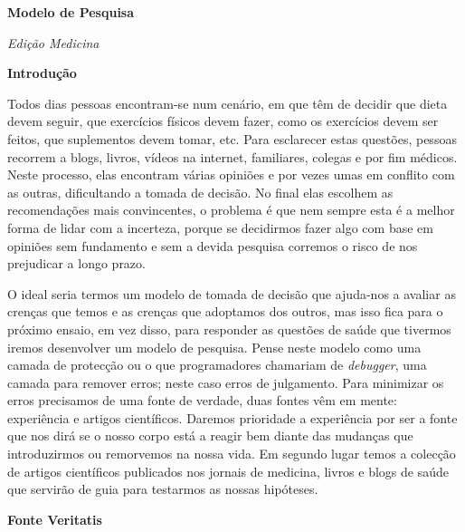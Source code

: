 \documentclass[12pt]{article}
\begin{document}
 

\begin{titlepage}
    \begin{center}
        \Huge\textbf{Modelo de Pesquisa}
         
        \Large\textit{Edi\c c\~ao Medicina}
         
        \vspace{10cm}
    \end{center}
\end{titlepage}

\begin{center}
    \Huge\textbf{Introdu\c c\~ao}
\end{center}

\justifying
Todos dias pessoas encontram-se num cen\'ario, em que t\^em de decidir que
dieta devem seguir, que exerc\'icios f\'isicos devem fazer, como os
exerc\'icios devem ser
feitos,  que suplementos
devem tomar, etc. Para esclarecer estas quest\~oes, pessoas recorrem a blogs,
livros, v\'ideos na internet, familiares, colegas e por fim  m\'edicos. Neste
processo, elas encontram v\'arias
opini\~oes e por vezes umas em conflito com as outras, dificultando a tomada
de decis\~ao. 
No final elas escolhem as recomenda\c c\~oes mais
convincentes, o problema \'e que nem sempre esta \'e a melhor forma de lidar
com a incerteza, porque se decidirmos fazer algo com base em opini\~oes
sem fundamento e sem a devida pesquisa corremos o risco de nos prejudicar a longo prazo. 

O ideal seria termos um modelo de tomada de decis\~ao que ajuda-nos a avaliar as
cren\c cas que temos e as cren\c cas que adoptamos dos outros, mas isso fica
para o pr\'oximo ensaio, em vez disso, para responder as quest\~oes de sa\'ude que
tivermos iremos desenvolver um modelo de pesquisa.  
Pense neste modelo como  uma camada de protec\c c\~ao ou o que programadores chamariam de \textit{debugger}, uma camada para remover erros; neste caso erros de julgamento.  
Para minimizar os erros precisamos de uma fonte de verdade, duas fontes v\^em
em mente: experi\^encia e artigos cient\'ificos. Daremos prioridade a
experi\^encia por ser a fonte que nos dir\'a se o nosso corpo est\'a a reagir
bem diante das mudan\c cas que introduzirmos ou remorvemos na nossa
vida. Em segundo lugar temos a colec\c c\~ao de artigos cient\'ificos
publicados nos jornais de medicina, livros e blogs de sa\'ude que servir\~ao de
guia para testarmos as nossas hip\'oteses. 
\pagebreak


\begin{center}
    \Huge\textbf{Fonte Veritatis}
\end{center}
\end{document}
